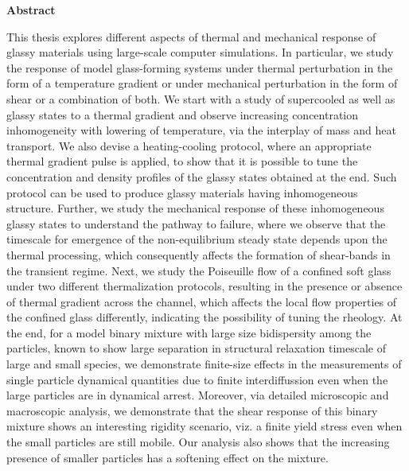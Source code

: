 \thispagestyle{plain}
\doublespacing
\vskip 1.0cm
%
\centerline{{\bf{\large Abstract}}}
%
This thesis explores different aspects of thermal and mechanical response of glassy materials using large-scale computer simulations. In particular, we study the response of model glass-forming systems under thermal perturbation in the form of a temperature gradient or under mechanical perturbation in the form of shear or a combination of both.  We start with a study of supercooled as well as glassy states to a thermal gradient and observe increasing concentration inhomogeneity with lowering of temperature, via the interplay of mass and heat transport.  We also devise a heating-cooling protocol, where an appropriate thermal gradient pulse is applied, to show that it is possible to tune the concentration and density profiles of the glassy states obtained at the end. Such protocol can be used to produce glassy materials having inhomogeneous structure. Further, we study the mechanical response of these inhomogeneous glassy states to understand the pathway to failure, where we observe that the timescale for emergence of the non-equilibrium steady state depends upon the thermal processing, which consequently affects the formation of shear-bands in the transient regime. Next, we study the Poiseuille flow of a confined soft glass under two different thermalization protocols, resulting in the presence or absence of thermal gradient across the channel, which affects the local flow properties of the confined glass differently, indicating the possibility of tuning the rheology. At the end, for a  model binary mixture with large size bidispersity among the particles, known to show large separation in structural relaxation timescale of large and small species, we demonstrate finite-size effects in the measurements of single particle dynamical quantities due to finite interdiffussion even when the large particles are in dynamical arrest. Moreover, via detailed microscopic and macroscopic analysis, we demonstrate that the shear response of this binary mixture shows an interesting  rigidity scenario, viz. a finite yield stress even when the small particles are still mobile. Our analysis also shows that the increasing presence of smaller particles has a softening effect on the mixture.